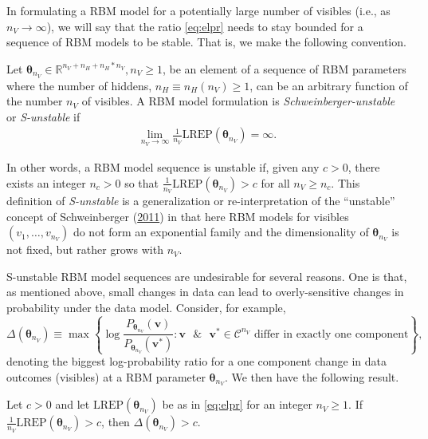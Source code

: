 \documentclass[]{article}
\theoremstyle{definition}
\newcommand{\nv}{{n_{\scriptscriptstyle V}}}
\newcommand{\nh}{{n_{\scriptscriptstyle H}}}
\let\BeginKnitrBlock\begin \let\EndKnitrBlock\end
\begin{document}
In formulating a RBM model for a potentially large number of visibles
(i.e., as \(\nv \rightarrow \infty\)), we will say that the ratio
\eqref{eq:elpr} needs to stay bounded for a sequence of RBM models to be
stable. That is, we make the following convention.
\BeginKnitrBlock{definition}[S-unstable RBM]
\protect\hypertarget{def:unnamed-chunk-1}{}{\label{def:unnamed-chunk-1}
{} }Let
\(\boldsymbol \theta_\nv \in \mathbb{R}^{\nv + \nh + \nh*\nv}, \nv \ge 1\),
be an element of a sequence of RBM parameters where the number of
hiddens, \(\nh \equiv \nh(\nv) \ge 1\), can be an arbitrary function of
the number \(\nv\) of visibles. A RBM model formulation is
\emph{Schweinberger-unstable} or \emph{S-unstable} if \begin{align*}
\lim\limits_{\nv \rightarrow \infty} \frac{1}{\nv} \text{LREP}(\boldsymbol \theta_\nv) = \infty.
\end{align*}
\EndKnitrBlock{definition}

In other words, a RBM model sequence is unstable if, given any
\(c > 0\), there exists an integer \(n_c > 0\) so that
\(\frac{1}{\nv}\text{LREP}(\boldsymbol \theta_\nv) > c\) for all
\(\nv \ge n_c\). This definition of \emph{S-unstable} is a
generalization or re-interpretation of the ``unstable'' concept of
Schweinberger
(\protect\hyperlink{ref-schweinberger2011instability}{2011}) in that
here RBM models for visibles \((v_1, \dots, v_\nv)\) do not form an
exponential family and the dimensionality of \(\boldsymbol \theta_\nv\)
is not fixed, but rather grows with \(\nv\).

S-unstable RBM model sequences are undesirable for several reasons. One
is that, as mentioned above, small changes in data can lead to
overly-sensitive changes in probability under the data model. Consider,
for example, \[
\Delta(\boldsymbol \theta_\nv) \equiv \max \left\{\log \frac{P_{\boldsymbol \theta_\nv}(\boldsymbol v)}{P_{\boldsymbol \theta_\nv}(\boldsymbol v^*)} : \boldsymbol v \text{ }\& \text{ } \boldsymbol v^* \in \mathcal{C}^\nv \text{ differ in exactly one component}\right\},
\] denoting the biggest log-probability ratio for a one component change
in data outcomes (visibles) at a RBM parameter
\(\boldsymbol \theta_\nv\). We then have the following result.

\BeginKnitrBlock{proposition}
\protect\hypertarget{prp:instab1}{}{\label{prp:instab1} }Let \(c > 0\) and
let \(\text{LREP}(\boldsymbol \theta_\nv)\) be as in \eqref{eq:elpr} for
an integer \(\nv \ge 1\). If
\(\frac{1}{\nv}\text{LREP}(\boldsymbol \theta_\nv) > c\), then
\(\Delta(\boldsymbol \theta_\nv) > c\).
\EndKnitrBlock{proposition}
\end{document}

